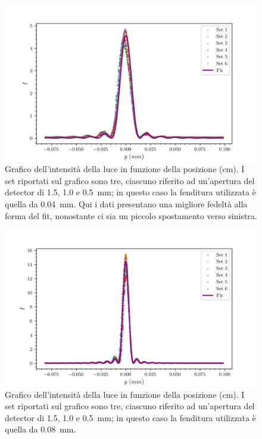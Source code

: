 \documentclass[../main.tex]{subfiles}
\begin{document}
\begin{figure}[ht!]
    \includegraphics{../graphs/fit_0.04_1.5.png}
    \caption{Grafico dell’intensità della luce in funzione della posizione (cm). I set riportati sul grafico sono tre, ciascuno riferito ad un’apertura del detector di \num{1.5}, \num{1.0} e \qty{0.5}{\milli\meter}; in questo caso la fenditura utilizzata è quella da \qty{0.04}{\milli\meter}. Qui i dati presentano una migliore fedeltà alla forma del fit, nonostante ci sia un piccolo spostamento verso sinistra.}
    \label{fig:fit_0.04_1.5}
\end{figure}

\begin{figure}[ht!]
    \includegraphics{../graphs/fit_0.08_1.5.png}
    \caption{Grafico dell’intensità della luce in funzione della posizione (cm). I set riportati sul grafico sono tre, ciascuno riferito ad un’apertura del detector di \num{1.5}, \num{1.0} e \qty{0.5}{\milli\meter}; in questo caso la fenditura utilizzata è quella da \qty{0.08}{\milli\meter}.}
    \label{fig:fit_0.08_1.5}
\end{figure}
\end{document}
